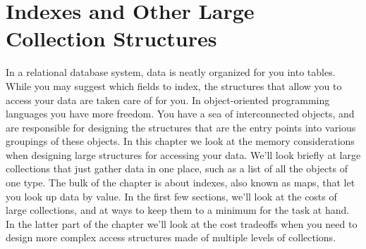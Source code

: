 \chapter{Indexes and Other Large Collection Structures}
\label{chapter:tables-indexes}

In a relational database system, data is neatly organized for you into tables.
While you may suggest which fields to index, the structures that
allow you to access your data are taken care of for you.  In object-oriented
programming languages you have more freedom. You have a sea of interconnected
objects, and are responsible for designing the structures that are the entry
points into various groupings of these objects.
In this chapter we look at the memory considerations when
designing large structures for accessing your
data. We'll
look briefly at large collections that just gather data in one place, such as a
list of all the objects of one type. The bulk of the chapter is about
indexes, also known as maps, that let you look up data by value. 
In the first few sections, we'll look at the costs of large
collections, and at ways to keep them to a minimum for the task at hand. In the latter part
of the chapter we'll look at the cost tradeoffs when you need to
design more complex access structures made of multiple levels of collections.  










